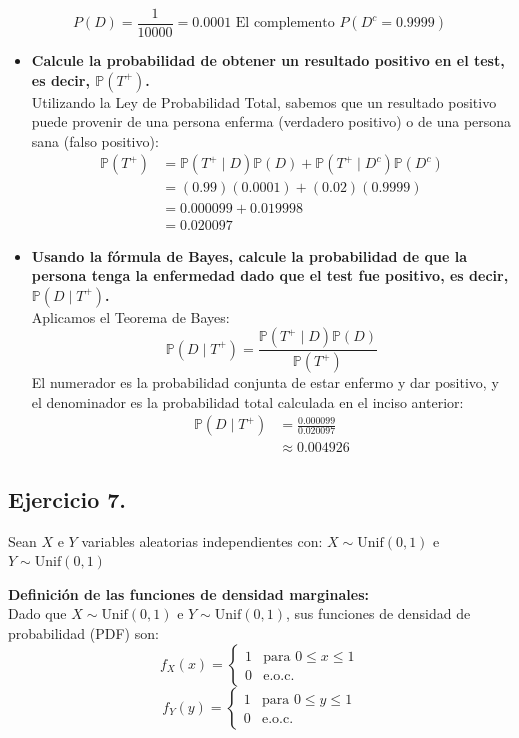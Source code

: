 \documentclass[10pt,a4paper]{book}
\begin{document}
\[
    P(D)=\frac{1}{10000} = 0.0001   \text{ El complemento } P(D^{c} = 0.9999) 
\]

\begin{itemize}
    \item[\textbf{a)}] \textbf{Calcule la probabilidad de obtener un resultado positivo en el test, es decir, $\mathbb{P}(T^+)$.} \\
    Utilizando la Ley de Probabilidad Total, sabemos que un resultado positivo puede provenir de una persona enferma (verdadero positivo) o de una persona sana (falso positivo):
    \begin{align*}
        \mathbb{P}(T^+) &= \mathbb{P}(T^+ \mid D)\mathbb{P}(D) + \mathbb{P}(T^+ \mid D^c)\mathbb{P}(D^c) \\
        &= (0.99)(0.0001) + (0.02)(0.9999) \\
        &= 0.000099 + 0.019998 \\
        &= 0.020097
    \end{align*}

    \item[\textbf{b)}] \textbf{Usando la fórmula de Bayes, calcule la probabilidad de que la persona tenga la enfermedad dado que el test fue positivo, es decir, $\mathbb{P}(D \mid T^+)$.} \\
    Aplicamos el Teorema de Bayes:
    \[ \mathbb{P}(D \mid T^+) = \frac{\mathbb{P}(T^+ \mid D)\mathbb{P}(D)}{\mathbb{P}(T^+)} \]
    El numerador es la probabilidad conjunta de estar enfermo y dar positivo, y el denominador es la probabilidad total calculada en el inciso anterior:
    \begin{align*}
        \mathbb{P}(D \mid T^+) &= \frac{0.000099}{0.020097} \\
        &\approx 0.004926
    \end{align*}
    
\end{itemize}

\newpage

\subsection{Ejercicio 7.} Sean \(X\) e \(Y\) variables aleatorias independientes con: $X \sim \text{Unif}(0, 1)$ e $Y \sim \text{Unif}(0, 1)$

\vspace{0.2cm}

\textbf{Definición de las funciones de densidad marginales:} \\
Dado que $X \sim \text{Unif}(0, 1)$ e $Y \sim \text{Unif}(0, 1)$, sus funciones de densidad de probabilidad (PDF) son:
\[ f_X(x) = \begin{cases} 1 & \text{para } 0 \le x \le 1 \\ 0 & \text{e.o.c.} \end{cases} \]
\[ f_Y(y) = \begin{cases} 1 & \text{para } 0 \le y \le 1 \\ 0 & \text{e.o.c.} \end{cases} \]
\end{document}
